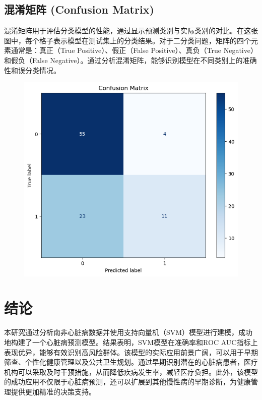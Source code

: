 \documentclass[UTF8]{article}
\begin{document}
	\subsection{混淆矩阵 (Confusion Matrix)}
	混淆矩阵用于评估分类模型的性能，通过显示预测类别与实际类别的对比。在这张图中，每个格子表示模型在测试集上的分类结果。对于二分类问题，矩阵的四个元素通常是：真正（True Positive）、假正（False Positive）、真负（True Negative）和假负（False Negative）。通过分析混淆矩阵，能够识别模型在不同类别上的准确性和误分类情况。
	\begin{figure}[h]
		\centering\includegraphics[width=0.5\linewidth]{5.png}
	\end{figure}
	\section{结论}
	本研究通过分析南非心脏病数据并使用支持向量机（SVM）模型进行建模，成功地构建了一个心脏病预测模型。结果表明，SVM模型在准确率和ROC AUC指标上表现优异，能够有效识别高风险群体。该模型的实际应用前景广阔，可以用于早期筛查、个性化健康管理以及公共卫生规划。通过早期识别潜在的心脏病患者，医疗机构可以采取及时干预措施，从而降低疾病发生率，减轻医疗负担。此外，该模型的成功应用不仅限于心脏病预测，还可以扩展到其他慢性病的早期诊断，为健康管理提供更加精准的决策支持。
\end{document}
